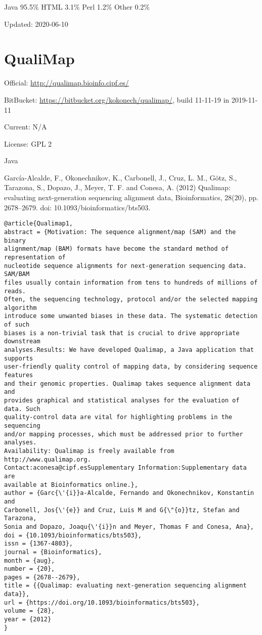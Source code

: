 \documentclass[]{article}
\begin{document}
Java 95.5\% HTML 3.1\% Perl 1.2\% Other 0.2\%

Updated: 2020-06-10

\section{QualiMap}

Official: \url{http://qualimap.bioinfo.cipf.es/}

BitBucket: \url{https://bitbucket.org/kokonech/qualimap/}, build 11-11-19 in 2019-11-11

Current: N/A

License: GPL 2

Java

García-Alcalde, F., Okonechnikov, K., Carbonell, J., Cruz, L. M., Götz, S., Tarazona, S., Dopazo, J., Meyer, T. F. and Conesa, A. (2012) Qualimap: evaluating next-generation sequencing alignment data, Bioinformatics, 28(20), pp. 2678–2679. doi: 10.1093/bioinformatics/bts503.

\begin{verbatim}
@article{Qualimap1,
abstract = {Motivation: The sequence alignment/map (SAM) and the binary
alignment/map (BAM) formats have become the standard method of representation of
nucleotide sequence alignments for next-generation sequencing data. SAM/BAM
files usually contain information from tens to hundreds of millions of reads.
Often, the sequencing technology, protocol and/or the selected mapping algorithm
introduce some unwanted biases in these data. The systematic detection of such
biases is a non-trivial task that is crucial to drive appropriate downstream
analyses.Results: We have developed Qualimap, a Java application that supports
user-friendly quality control of mapping data, by considering sequence features
and their genomic properties. Qualimap takes sequence alignment data and
provides graphical and statistical analyses for the evaluation of data. Such
quality-control data are vital for highlighting problems in the sequencing
and/or mapping processes, which must be addressed prior to further analyses.
Availability: Qualimap is freely available from http://www.qualimap.org.
Contact:aconesa@cipf.esSupplementary Information:Supplementary data are
available at Bioinformatics online.},
author = {Garc{\'{i}}a-Alcalde, Fernando and Okonechnikov, Konstantin and
Carbonell, Jos{\'{e}} and Cruz, Luis M and G{\"{o}}tz, Stefan and Tarazona,
Sonia and Dopazo, Joaqu{\'{i}}n and Meyer, Thomas F and Conesa, Ana},
doi = {10.1093/bioinformatics/bts503},
issn = {1367-4803},
journal = {Bioinformatics},
month = {aug},
number = {20},
pages = {2678--2679},
title = {{Qualimap: evaluating next-generation sequencing alignment data}},
url = {https://doi.org/10.1093/bioinformatics/bts503},
volume = {28},
year = {2012}
}
\end{verbatim}
\end{document}
